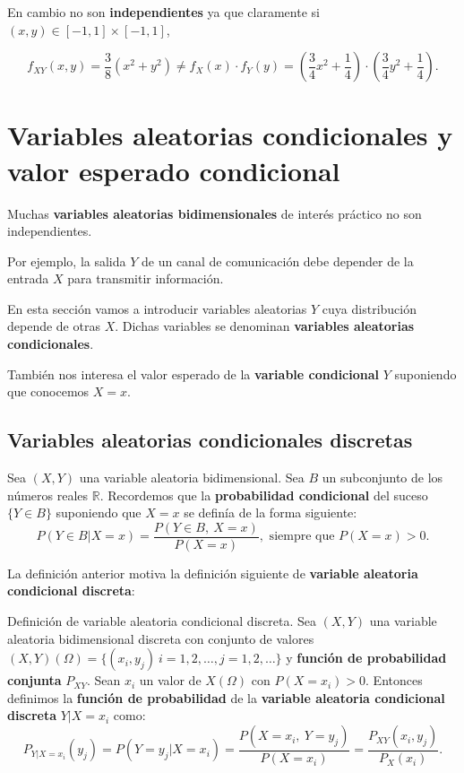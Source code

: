 \documentclass[
  letterpaper,
  DIV=11,
  numbers=noendperiod]{scrreprt}
\begin{document}
En cambio no son \textbf{independientes} ya que claramente si
\((x,y)\in [-1,1]\times [-1,1]\),

\[
f_{XY}(x,y)=\frac{3}{8}(x^2+y^2) \neq f_X(x)\cdot f_Y(y)=\left(\frac{3}{4} x^2+\frac{1}{4}\right)\cdot \left(\frac{3}{4} y^2+\frac{1}{4}\right).
\]

\hypertarget{variables-aleatorias-condicionales-y-valor-esperado-condicional}{%
\section{Variables aleatorias condicionales y valor esperado
condicional}\label{variables-aleatorias-condicionales-y-valor-esperado-condicional}}

Muchas \textbf{variables aleatorias bidimensionales} de interés práctico
no son independientes.

Por ejemplo, la salida \(Y\) de un canal de comunicación debe depender
de la entrada \(X\) para transmitir información.

En esta sección vamos a introducir variables aleatorias \(Y\) cuya
distribución depende de otras \(X\). Dichas variables se denominan
\textbf{variables aleatorias condicionales}.

También nos interesa el valor esperado de la \textbf{variable
condicional} \(Y\) suponiendo que conocemos \(X=x\).

\hypertarget{variables-aleatorias-condicionales-discretas}{%
\subsection{Variables aleatorias condicionales
discretas}\label{variables-aleatorias-condicionales-discretas}}

Sea \((X,Y)\) una variable aleatoria bidimensional. Sea \(B\) un
subconjunto de los números reales \(\mathbb{R}\). Recordemos que la
\textbf{probabilidad condicional} del suceso \(\{Y\in B\}\) suponiendo
que \(X=x\) se definía de la forma siguiente: \[
P(Y\in B|X=x)=\frac{P(Y\in B,\ X=x)}{P(X=x)}, \mbox{ siempre que }P(X=x)>0.
\]

La definición anterior motiva la definición siguiente de
\textbf{variable aleatoria condicional discreta}:

Definición de variable aleatoria condicional discreta. Sea \((X,Y)\) una
variable aleatoria bidimensional discreta con conjunto de valores
\((X,Y)(\Omega)=\{(x_i,y_j)\ i=1,2,\ldots, j=1,2,\ldots\}\) y
\textbf{función de probabilidad conjunta} \(P_{XY}\). Sean \(x_i\) un
valor de \(X(\Omega)\) con \(P(X=x_i)>0\). Entonces definimos la
\textbf{función de probabilidad} de la \textbf{variable aleatoria
condicional discreta} \(Y|X=x_i\) como: \[
P_{Y|X=x_i}(y_j)=P(Y=y_j|X=x_i)=\frac{P(X=x_i,\ Y=y_j)}{P(X=x_i)}=\frac{P_{XY}(x_i,y_j)}{P_X(x_i)}.
\]
\end{document}
